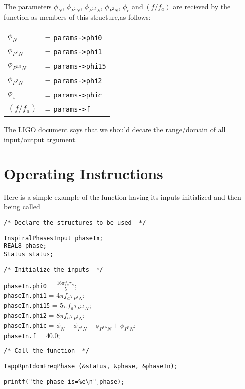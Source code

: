 \documentclass[12pt]{article}
\begin{document}
\vspace{5mm}


The parameters $\phi_{N}$, $\phi_{P^{1}N}$, $\phi_{P^{1.5}N}$, $\phi_{P^{2}N}$,  $\phi_{c}$ and $(f/f_{a})$ are recieved by the function as members of this structure,as follows:

\vspace{5mm}

\begin{tabular}{ll}
$\phi_{N}$        &= \texttt{params->phi0}  \\
$\phi_{P^{1}N}$   &= \texttt{params->phi1}  \\
$\phi_{P^{1.5}N}$ &= \texttt{params->phi15}  \\
$\phi_{P^{2}N}$   &= \texttt{params->phi2}  \\
$\phi_{c}$        &= \texttt{params->phic}  \\
$(f/f_{a})$       &= \texttt{params->f}
\end{tabular}

\vspace{5mm}

The LIGO document says that we should decare the range/domain of all input/output argument.


\section{Operating Instructions}

Here is a simple example of the function having its inputs initialized and then being called

\vspace{5mm}

\noindent
\begin{verbatim}
/* Declare the structures to be used  */
\end{verbatim}
\texttt{InspiralPhasesInput phaseIn;} \\
\texttt{REAL8 phase;}\\
\texttt{Status status;} \\
\begin{verbatim}
/* Initialize the inputs  */
\end{verbatim}
\texttt{phaseIn.phi0} = $\frac{16 \pi f_{a} \tau_{N}}{5}$; \\
\texttt{phaseIn.phi1} = $4 \pi f_{a} \tau_{P^{1}N}$; \\
\texttt{phaseIn.phi15} = $5 \pi f_{a} \tau_{P^{1.5}N}$; \\
\texttt{phaseIn.phi2} = $8 \pi f_{a} \tau_{P^{2}N}$; \\
\texttt{phaseIn.phic} = $\phi_{N} + \phi_{P^{1}N} - \phi_{P^{1.5}N} + \phi_{P^{2}N}$; \\ \texttt{phaseIn.f} = 40.0; \\
\begin{verbatim}
/* Call the function  */
\end{verbatim}
\texttt{TappRpnTdomFreqPhase (\&status, \&phase, \&phaseIn);} \\
\begin{verbatim}
printf("the phase is=%e\n",phase);
\end{verbatim}
\end{document}
